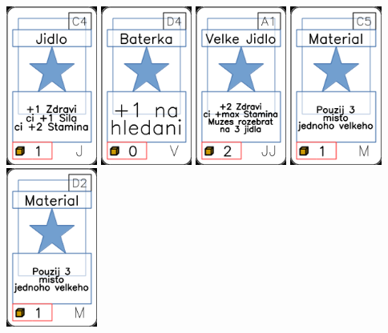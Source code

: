 \documentclass[a4paper]{article}
\begin{document}
	\includegraphics[width=3.0cm]{img-1_13}
	\includegraphics[width=3.0cm]{img-1_78}
	\includegraphics[width=3.0cm]{img-1_30}
	\includegraphics[width=3.0cm]{img-1_44}
	\includegraphics[width=3.0cm]{img-1_46}
\end{document}
